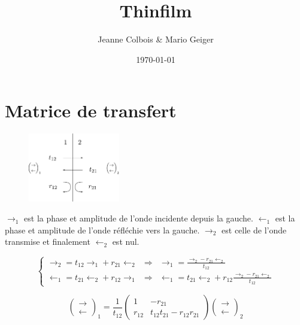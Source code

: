 \documentclass[a4paper,english]{article}
\begin{document}
\title{Thinfilm}
\author{Jeanne Colbois \& Mario Geiger}
\date{\today}
\maketitle

\section{Matrice de transfert}

\begin{figure}[H]
	\centering
	\includegraphics[height=3cm]{Figures/interface.pdf}
\end{figure}

$\rightarrow_1$ est la phase et amplitude de l'onde incidente depuis la gauche. $\leftarrow_1$ est la phase et amplitude de l'onde réfléchie vers la gauche. $\rightarrow_2$ est celle de l'onde transmise et finalement $\leftarrow_2$ est nul.

\begin{equation}
\left\{ \begin{array}{lll}
\rightarrow_2 = t_{12} \rightarrow_1 + r_{21} \leftarrow_2  &\Rightarrow &\rightarrow_1 = \frac{\rightarrow_2 - r_{21} \leftarrow_2}{t_{12}} \\
\leftarrow_1 = t_{21} \leftarrow_2 + r_{12} \rightarrow_1 &\Rightarrow &\leftarrow_1 = t_{21} \leftarrow_2 + r_{12} \frac{\rightarrow_2 - r_{21} \leftarrow_2}{t_{12}}
\end{array}\right.
\end{equation}

\begin{equation}\label{mtrans}
\begin{pmatrix}\rightarrow \\ \leftarrow \end{pmatrix}_1 =
\frac{1}{t_{12}}\begin{pmatrix} 1 & -r_{21} \\ r_{12} & t_{12}t_{21} - r_{12}r_{21} \end{pmatrix}
\begin{pmatrix}\rightarrow \\ \leftarrow\end{pmatrix}_2
\end{equation}
\end{document}
